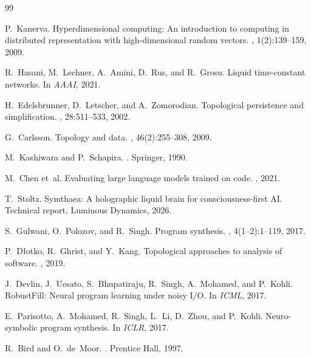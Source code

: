 \documentclass[11pt,a4paper]{article}
\begin{document}

\begin{thebibliography}{99}

P.~Kanerva.
\newblock Hyperdimensional computing: An introduction to computing in
  distributed representation with high-dimensional random vectors.
, 1(2):139--159, 2009.

R.~Hasani, M.~Lechner, A.~Amini, D.~Rus, and R.~Grosu.
\newblock Liquid time-constant networks.
\newblock In {\em AAAI}, 2021.

H.~Edelsbrunner, D.~Letscher, and A.~Zomorodian.
\newblock Topological persistence and simplification.
, 28:511--533, 2002.

G.~Carlsson.
\newblock Topology and data.
, 46(2):255--308, 2009.

M.~Kashiwara and P.~Schapira.
.
\newblock Springer, 1990.

M.~Chen et~al.
\newblock Evaluating large language models trained on code.
, 2021.

T.~Stoltz.
\newblock Symthaea: A holographic liquid brain for consciousness-first AI.
\newblock Technical report, Luminous Dynamics, 2026.

S.~Gulwani, O.~Polozov, and R.~Singh.
\newblock Program synthesis.
, 4(1--2):1--119, 2017.

P.~D{\l}otko, R.~Ghrist, and Y.~Kang.
\newblock Topological approaches to analysis of software.
, 2019.

J.~Devlin, J.~Uesato, S.~Bhupatiraju, R.~Singh, A.~Mohamed, and P.~Kohli.
\newblock RobustFill: Neural program learning under noisy I/O.
\newblock In {\em ICML}, 2017.

E.~Parisotto, A.~Mohamed, R.~Singh, L.~Li, D.~Zhou, and P.~Kohli.
\newblock Neuro-symbolic program synthesis.
\newblock In {\em ICLR}, 2017.

R.~Bird and O.~de~Moor.
.
\newblock Prentice Hall, 1997.

\end{thebibliography}
\end{document}
